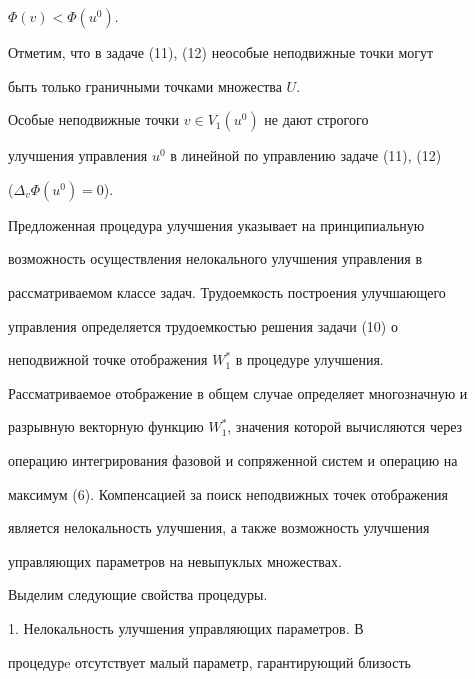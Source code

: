 $\Phi(v)<\Phi(u^0)$. 


 


Отметим, что в задаче (11), (12) неособые неподвижные точки могут 


быть только граничными точками множества $U$. 


 


\begin{cor} 


Особые неподвижные точки $v\in V_1(u^0)$ не дают строгого 


улучшения управления $u^0$ в линейной по управлению задаче (11), (12) 


($\Delta_v\Phi(u^0)=0$). 


\end{cor} 


 


Предложенная процедура улучшения указывает на принципиальную 


возможность осуществления нелокального улучшения управления в 


рассматриваемом классе задач. Трудоемкость построения улучшающего 


управления определяется трудоемкостью решения задачи (10) о 


неподвижной точке отображения $W^*_1$ в процедуре улучшения. 


Рассматриваемое отображение в общем случае определяет многозначную и 


разрывную векторную функцию $W^*_1$, значения которой вычисляются через 


операцию интегрирования фазовой и сопряженной систем и операцию на 


максимум (6). Компенсацией за поиск неподвижных точек отображения 


является нелокальность улучшения, а также возможность улучшения 


управляющих параметров на невыпуклых множествах. 


 


Выделим следующие свойства процедуры. 


 


1. Нелокальность улучшения управляющих параметров. В 


процедурe отсутствует малый параметр, гарантирующий близость 


